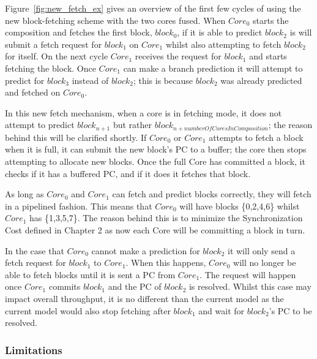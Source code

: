 Figure~\ref{fig:new_fetch_ex} gives an overview of the first few cycles of using the new block-fetching scheme with the two cores fused.
When $Core_0$ starts the composition and fetches the first block, $block_0$, if it is able to predict $block_2$ is will submit a fetch request for $block_1$ on $Core_1$ whilst also attempting to fetch $block_2$ for itself.
On the next cycle $Core_1$ receives the request for $block_1$ and starts fetching the block.
Once $Core_1$ can make a branch prediction it will attempt to predict for $block_3$ instead of $block_2$; this is because $block_2$ was already predicted and fetched on $Core_0$.

In this new fetch mechanism, when a core is in fetching mode, it does not attempt to predict $block_{n+1}$ but rather $block_{n+numberOfCoresInComposition}$; the reason behind this will be clarified shortly.
If $Core_0$ or $Core_1$ attempts to fetch a block when it is full, it can submit the new block's PC to a buffer; the core then stops attempting to allocate new blocks.
Once the full Core has committed a block, it checks if it has a buffered PC, and if it does it fetches that block.

As long as $Core_0$ and $Core_1$ can fetch and predict blocks correctly, they will fetch in a pipelined fashion.
This means that $Core_0$ will have blocks \{0,2,4,6\} whilst $Core_1$ has \{1,3,5,7\}.
The reason behind this is to minimize the Synchronization Cost defined in Chapter 2 as now each Core will be committing a block in turn.

In the case that $Core_0$ cannot make a prediction for $block_2$ it will only send a fetch request for $block_1$ to $Core_1$.
When this happens, $Core_0$ will no longer be able to fetch blocks until it is sent a PC from $Core_1$.
The request will happen once $Core_1$ commits $block_1$ and the PC of $block_2$ is resolved.
Whilst this case may impact overall throughput, it is no different than the current model as the current model would also stop fetching after $block_1$ and wait for $block_2$'s PC to be resolved.

\subsubsection{Limitations}

